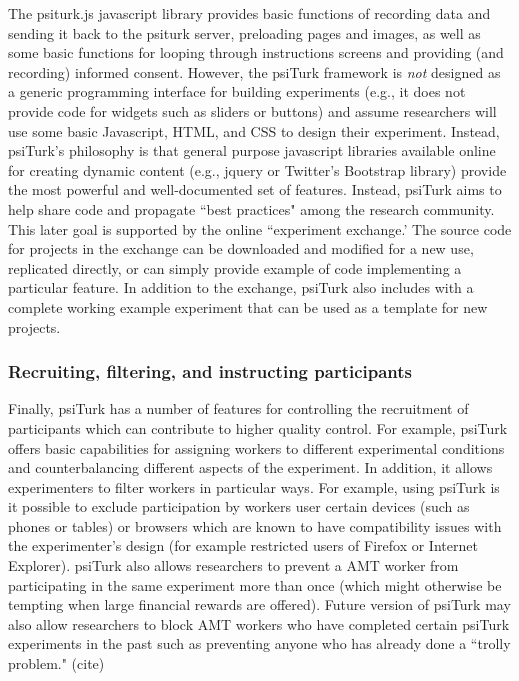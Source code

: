 \documentclass[twocolumn]{svjour3}          %
\begin{document}
The psiturk.js javascript library provides basic functions of recording data and sending it back to the psiturk server,
preloading pages and images, as well as some basic functions for looping through instructions
screens and providing (and recording) informed consent.
However, the \textsf{psiTurk} framework is \emph{not} designed as a generic
programming interface for building 
experiments (e.g., it does not provide code for widgets such as sliders or buttons) and assume
researchers will use some basic Javascript, HTML, and CSS to design their experiment.  Instead, \textsf{psiTurk}'s
philosophy is that general purpose javascript libraries available online for creating dynamic content (e.g., jquery or
Twitter's Bootstrap library) provide the most powerful and well-documented set of features.  Instead, \textsf{psiTurk}
aims to help share code and propagate ``best practices" among the research community.
This later goal is supported by the online ``experiment exchange.'
The source code for projects in the exchange can be downloaded and modified for a new use,
replicated directly, or can simply provide example of code implementing a particular 
feature.  In addition to the exchange, \textsf{psiTurk} also includes with a complete working example 
experiment that can be used as a template for new projects.



\subsubsection{Recruiting, filtering, and instructing participants}
Finally, \textsf{psiTurk} has a number of features for controlling the recruitment
of participants which can contribute to higher quality control.
For example, \textsf{psiTurk} offers basic capabilities for assigning workers to different experimental conditions 
and counterbalancing different aspects of the experiment.
In addition, it allows experimenters to filter workers in particular ways.  For example, using \textsf{psiTurk}
is it possible to exclude participation by workers user certain devices (such as phones or tables) or browsers
which are known to have compatibility issues with the experimenter's design (for example restricted
users of Firefox or Internet Explorer).  \textsf{psiTurk} also allows researchers to prevent a AMT worker from 
participating in the same experiment more than once (which might otherwise be tempting when
large financial rewards are offered).  Future version of \textsf{psiTurk} may also allow researchers to 
block AMT workers who have completed certain \textsf{psiTurk} experiments in the past such as
preventing anyone who has already done a ``trolly problem." (cite)
\end{document}
